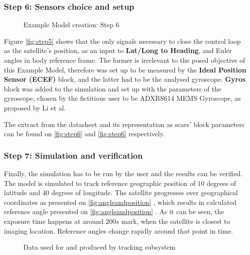         \subsubsection*{Step 6: Sensors choice and setup}
            \begin{figure}[H]
                \centering
                \quad
                \caption{Example Model creation: Step 6}%
                \label{fig:step6}%
            \end{figure}
            Figure \autoref{fig:step5} shows that the only signals necessary to close the control loop as the satellite's position, as an input to \textbf{Lat/Long to Heading}, and Euler angles in body reference frame. The former is irrelevant to the posed objective of this Example Model, therefore was set up to be measured by the \textbf{Ideal Position Sensor (ECEF)} block, and the latter had to be the analysed gyroscope. \textbf{Gyros} block was added to the simulation and set up with the parameters of the gyroscope, chosen by the fictitious user to be ADXRS614 MEMS Gyroscope, as proposed by Li et al\cite{li2013design}.
            
            The extract from the datasheet and its representation as \ac{scars}' block parameters can be found on \autoref{fig:step6}  and \autoref{fig:step6}  respectively.

            \vfill
        \subsubsection*{Step 7: Simulation and verification}
            Finally, the simulation has to be run by the user and the results can be verified. The model is simulated to track reference geographic position of $10$ degrees of latitude and $40$ degrees of longitude. The satellite progresses over geographical coordinates as presented on \autoref{fig:angleandposition} , which results in calculated reference angle presented on \autoref{fig:angleandposition} . As it can be seen, the exposure time happens at around $200s$ mark, when the satellite is closest to imaging location. Reference angles change rapidly around that point in time.

            \vfill
            \begin{figure}[H]
                \centering
                \quad
                \caption{Data used for and produced by tracking subsystem}%
                \label{fig:angleandposition}%
            \end{figure}
            \vfill
            \clearpage

